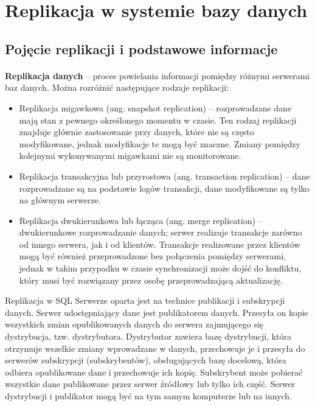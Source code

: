 \documentclass{article}
\begin{document}
 
\section{Replikacja w systemie bazy danych}
	\subsection{Pojęcie replikacji i podstawowe informacje}
	\paragraph{}
\textbf{Replikacja danych} – proces powielania informacji pomiędzy różnymi serwerami baz danych. Można rozróżnić następujące rodzaje replikacji:
	\begin{itemize}
	
\item	Replikacja migawkowa (ang. snapshot replication) – rozprowadzane dane mają stan z pewnego określonego momentu w czasie. Ten rodzaj replikacji znajduje głównie zastosowanie przy danych, które nie są często modyfikowane, jednak modyfikacje te mogą być znaczne. Zmiany pomiędzy kolejnymi wykonywanymi migawkami nie są monitorowane.
\item	Replikacja transakcyjna lub przyrostowa (ang. transaction replication) – dane rozprowadzane są na podstawie logów transakcji, dane modyfikowane są tylko na głównym serwerze.
\item	Replikacja dwukierunkowa lub łącząca (ang. merge replication) – dwukierunkowe rozprowadzanie danych; serwer realizuje transakcje zarówno od innego serwera, jak i od klientów. Transakcje realizowane przez klientów mogą być również przeprowadzone bez połączenia pomiędzy serwerami, jednak w takim przypadku w czasie synchronizacji może dojść do konfliktu, który musi być rozwiązany przez osobę przeprowadzającą aktualizację.

	\end{itemize}

Replikacja w SQL Serwerze oparta jest na technice publikacji i subskrypcji danych. Serwer udostępniający dane jest publikatorem danych. Przesyła on kopie wszystkich zmian opublikowanych danych do serwera zajmującego się dystrybucja, tzw. dystrybutora.
Dystrybutor zawiera bazę dystrybucji, która otrzymuje wszelkie zmiany wprowadzane w danych, przechowuje je i przesyła do serwerów subskrypcji (subskrybentów), obsługujących bazę docelową, która odbiera opublikowane dane i przechowuje ich kopię.
Subskrybent może pobierać wszystkie dane publikowane przez serwer źródłowy lub tylko ich część. Serwer dystrybucji i publikator mogą być na tym samym komputerze lub na innych.
\end{document}
